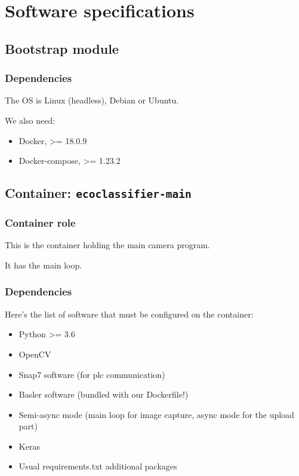 \chapter{Software specifications}
\label{chapter:softwarereqs}


\section{Bootstrap module}

\subsection{Dependencies}

The OS is Linux (headless), Debian or Ubuntu.


We also need:

\begin{itemize}
    \item Docker, >= 18.0.9
    \item Docker-compose, >= 1.23.2
\end{itemize}


\section{Container: \texttt{ecoclassifier-main}}

\subsection{Container role}

This is the container holding the main camera program.

It has the main loop.

\subsection{Dependencies}


Here's the list of software that must be configured on the container:

\begin{itemize}
    \item Python >= 3.6
    \item OpenCV
    \item Snap7 software (for \gls{plc} communication)
    \item Basler software (bundled with our Dockerfile!)
    \item Semi-async mode (main loop for image capture, async mode for the upload part)
    \item Keras
    \item Usual requirements.txt additional packages
\end{itemize}

